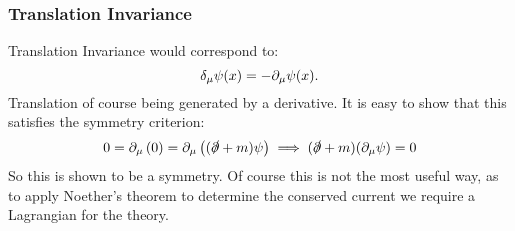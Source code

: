 \subsubsection{Translation Invariance}
Translation Invariance would correspond to:
\begin{equation}
    \delta_\mu \psi(x) = -\partial_\mu \psi(x).
\end{equation}
Translation of course being generated by a derivative. It is easy to show that this satisfies the symmetry criterion:
\begin{equation}
    0 = \partial_\mu \left(0\right) = \partial_\mu \left((\slashed{\partial} + m)\psi\right)\implies (\slashed{\partial} + m)(\partial_\mu \psi) = 0
\end{equation}
So this is shown to be a symmetry. Of course this is not the most useful way, as to apply Noether's theorem to determine the conserved current we require a Lagrangian for the theory. 

